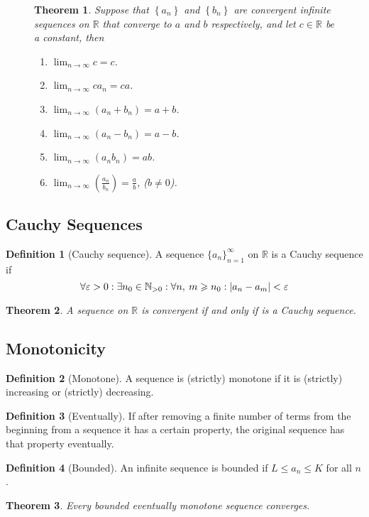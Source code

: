 \documentclass{article}
\newcommand*{\N}{\mathbb{N}}
\newcommand*{\R}{\mathbb{R}}
\theoremstyle{plain}
\newtheorem{theorem}{Theorem}[section]
\numberwithin{theorem}{subsection}
\theoremstyle{definition}
\newtheorem{definition}{Definition}[section]
\numberwithin{definition}{subsection}
\theoremstyle{remark}
\numberwithin{note}{subsection}
\begin{document}
\begin{figure}[H]
	\begin{mdframed}[style=exampledefault,frametitle={Limit Laws for Sequences}]
		\begin{theorem}
			Suppose that $\left\{a_n\right\}$ and $\left\{b_n\right\}$ are convergent infinite sequences on $\R$ that converge to $a$ and $b$ respectively, and let $c\in\R$ be a constant, then
			\begin{enumerate}[label=\normalfont\alph*)]
				\item $\lim_{n\to\infty}c=c$.
				\item $\lim_{n\to\infty}ca_n=ca$.
				\item $\lim_{n\to\infty}\left( a_n + b_n \right)=a+b$.
				\item $\lim_{n\to\infty}\left( a_n - b_n \right)=a-b$.
				\item $\lim_{n\to\infty}\left( a_nb_n \right)=ab$.
				\item $\lim_{n\to\infty}\left( \frac{a_n}{b_n} \right)=\frac{a}{b}$, ($b\neq 0$).
			\end{enumerate}
		\end{theorem}
	\end{mdframed}
\end{figure}
%
\subsection{Cauchy Sequences}
\begin{definition}[Cauchy sequence]
	A sequence $\{a_n\}_{n=1}^\infty$ on $\R$ is a Cauchy sequence if
	\begin{equation*}
		\forall \varepsilon > 0:\exists n_0\in\N_{>0}:\forall n,\: m \geqslant n_0:\abs{a_n-a_m}<\varepsilon
	\end{equation*}
\end{definition}
\begin{theorem}
	A sequence on $\R$ is convergent if and only if is a Cauchy sequence.
\end{theorem}
\subsection{Monotonicity}
%
\begin{definition}[Monotone]
    A sequence is (strictly) monotone if it is
    (strictly) increasing or (strictly) decreasing.
\end{definition}
%
\begin{definition}[Eventually]
    If after removing a finite number of terms from the beginning from a sequence
    it has a certain property, the original sequence has that property eventually.
\end{definition}
%
\begin{definition}[Bounded]
    An infinite sequence is bounded if $L \leqslant a_n \leqslant K$ for all $n$.
\end{definition}
%
\begin{theorem}
    Every bounded eventually monotone sequence converges.
\end{theorem}
%
\end{document}
